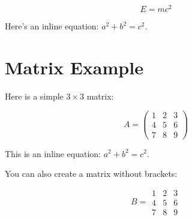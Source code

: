 \documentclass{article}
\begin{document}
\[
E = mc^2
\]

Here's an inline equation: \( a^2 + b^2 = c^2 \).

\section*{Matrix Example}

Here is a simple \( 3 \times 3 \) matrix:

\[
A =
\begin{pmatrix} %
1 & 2 & 3 \\
4 & 5 & 6 \\
7 & 8 & 9
\end{pmatrix}
\]

This is an inline equation: \( a^2 + b^2 = c^2 \).
	

You can also create a matrix without brackets:

\[
B =
\begin{matrix} %
1 & 2 & 3 \\
4 & 5 & 6 \\
7 & 8 & 9
\end{matrix}
\]
\end{document}
